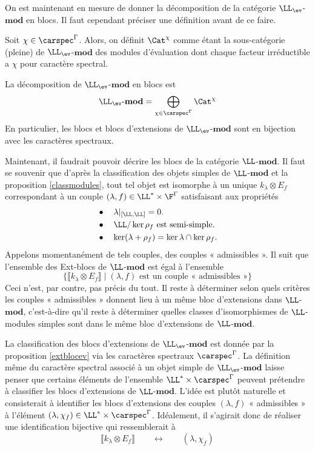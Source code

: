 On est maintenant en mesure de donner la décomposition de la catégorie $\LL_{\ev}$-$\mathbf{mod}$ en blocs. Il faut cependant préciser une définition avant de ce faire.

\begin{Def} Soit $\chi \in \carspec^\Gamma$. Alors, on définit $\Cat^\chi$ comme étant la sous-catégorie (pleine) de $\LL_{\ev}$-$\mathbf{mod}$ des modules d'évaluation dont chaque facteur irréductible a $\chi$ pour caractère spectral.
\end{Def}

\begin{Cor} \label{blocev} La décomposition de $\LL_{\ev}$-$\mathbf{mod}$ en blocs est
$$ \text{$\LL_{\ev}$-$\mathbf{mod}$} = \bigoplus_{\chi \in \carspec^\Gamma} \Cat^\chi $$
En particulier, les blocs et blocs d'extensions de $\LL_{\ev}$-$\mathbf{mod}$ sont en bijection avec les caractères spectraux.
\end{Cor}

Maintenant, il faudrait pouvoir décrire les blocs de la catégorie $\LL$-$\mathbf{mod}$. Il faut se souvenir que d'après la classification des objets simples de $\LL$-$\mathbf{mod}$ et la proposition \ref{classmodules}, tout tel objet est isomorphe à un unique $k_\lambda \otimes E_f$ correspondant à un couple $(\lambda,f) \in \LL^* \times \F^\Gamma$ satisfaisant aux propriétés 
\begin{align*}
&\bullet \quad \lambda|_{[\LL,\LL]} = 0.\\
&\bullet \quad \LL/\ker \rho_f \text{ est semi-simple}.\\
&\bullet \quad \ker(\lambda+\rho_f) = \ker \lambda \cap \ker \rho_f.
\end{align*}
Appelons momentanément de tels couples, des couples « admissibles ». Il suit que l'ensemble des Ext-blocs de $\LL$-$\mathbf{mod}$ est égal à l'ensemble 
$$ \big\{\llbracket k_\lambda \otimes E_f \rrbracket \; | \; (\lambda,f) \text{ est un couple « admissibles »}\big\} $$ 
Ceci n'est, par contre, pas précis du tout. Il reste à déterminer selon quels critères les couples « admissibles » donnent lieu à un même bloc d'extensions dans $\LL$-$\mathbf{mod}$, c'est-à-dire qu'il reste à déterminer quelles classes d'isomorphismes de $\LL$-modules simples sont dans le même bloc d'extensions de $\LL$-$\mathbf{mod}$.

La classification des blocs d'extensions de $\LL_{\ev}$-$\mathbf{mod}$ est donnée par la proposition \ref{extblocev} via les caractères spectraux $\carspec^\Gamma$. La définition même du caractère spectral associé à un objet simple de $\LL_{\ev}$-$\mathbf{mod}$ laisse penser que certains éléments de l'ensemble $\LL^* \times \carspec^\Gamma$ peuvent prétendre à classifier les blocs d'extensions de $\LL$-$\mathbf{mod}$. L'idée est plutôt naturelle et consisterait à identifier les blocs d'extensions des couples $(\lambda,f)$ « admissibles » à l'élément $(\lambda,\chi_f) \in \LL^* \times \carspec^\Gamma$. Idéalement, il s'agirait donc de réaliser une identification bijective qui ressemblerait à 
$$ \llbracket k_\lambda \otimes E_f \rrbracket \qquad \longleftrightarrow \qquad (\lambda,\chi_f) $$

